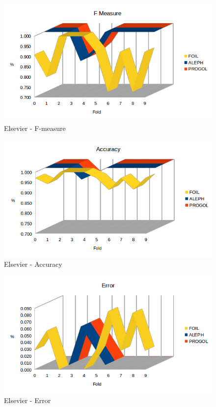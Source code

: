 \begin{figure}[H]
	\includegraphics[width=1.1\textwidth]{img/datasetGraph/elsevier/fm.png}
	\caption{Elsevier - F-measure}
	\label{Elsevier-F-measure}
\end{figure}

\begin{figure}[H]
\includegraphics[width=1.1\textwidth]{img/datasetGraph/elsevier/accuracy.png}
\caption{Elsevier - Accuracy}
\label{Elsevier-Accuracy}
\end{figure}

\begin{figure}[H]
	\includegraphics[width=1.1\textwidth]{img/datasetGraph/elsevier/error.png}
	\caption{Elsevier - Error}
	\label{Elsevier-Error}
\end{figure}

